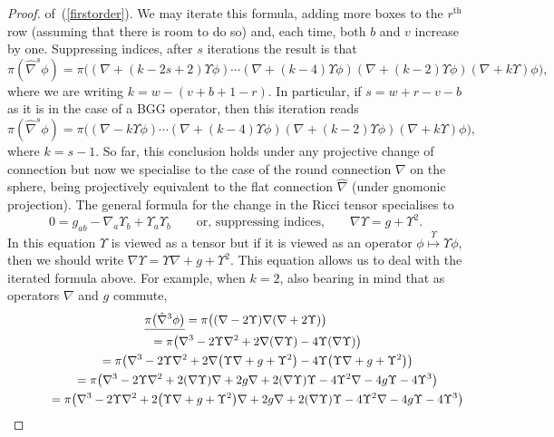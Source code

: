 \begin{proof}
of~(\ref{firstorder}). We may iterate this formula, adding more boxes to the
$r^{\mathrm{th}}$ row (assuming that there is room to do so) and, each time,
both $b$ and $v$ increase by one. Suppressing indices, after $s$
iterations the result is that
\[\pi(\hat\nabla^s\phi)=\pi\big(
(\nabla+(k-2s+2)\Upsilon\phi)\cdots
(\nabla+(k-4)\Upsilon\phi)(\nabla+(k-2)\Upsilon\phi)
(\nabla+k\Upsilon)\phi\big),\]
where we are writing $k=w-(v+b+1-r)$. In particular, if $s=w+r-v-b$ as it
is in the case of a BGG operator, then this iteration reads
\[\pi(\hat\nabla^s\phi)=\pi\big(
(\nabla-k\Upsilon\phi)\cdots
(\nabla+(k-4)\Upsilon\phi)(\nabla+(k-2)\Upsilon\phi)
(\nabla+k\Upsilon)\phi\big),\]
where $k=s-1$.
So far, this conclusion holds under any projective change of connection but now
we specialise to the case of the round connection $\nabla$ on the sphere, being
projectively equivalent to the f\/lat connection $\hat\nabla$ (under gnomonic
projection). The general formula \cite[(3.4)]{eProjective} for the
change in the Ricci tensor specialises to
\[0=g_{ab}-\nabla_a\Upsilon_b+\Upsilon_a\Upsilon_b\qquad\mbox{or, suppressing
indices,}\qquad\nabla\Upsilon=g+\Upsilon^2.\]
In this equation $\Upsilon$ is viewed as a tensor but if it is viewed as an
operator $\phi\stackrel{\Upsilon}{\longmapsto}\Upsilon\phi$, then we should
write $\nabla\Upsilon=\Upsilon\nabla+g+\Upsilon^2$. This equation allows us to
deal with the iterated formula above. For example, when $k=2$, also bearing in
mind that as operators $\nabla$ and $g$ commute,
 \begin{gather*}
 \underline{\pi\big(\hat\nabla^3\phi\big)}=
 \pi\big((\nabla-2\Upsilon)\nabla(\nabla+2\Upsilon)\big)\\
\hphantom{\underline{\pi\big(\hat\nabla^3\phi\big)}}{} = \pi\big(\nabla^3-2\Upsilon\nabla^2+2\nabla(\nabla\Upsilon)
-4\Upsilon(\nabla\Upsilon)\big)\\
\hphantom{\underline{\pi\big(\hat\nabla^3\phi\big)}}{} =
\pi\big(\nabla^3-2\Upsilon\nabla^2+2\nabla\big(\Upsilon\nabla+g+\Upsilon^2\big)
-4\Upsilon\big(\Upsilon\nabla+g+\Upsilon^2\big)\big)\\
\hphantom{\underline{\pi\big(\hat\nabla^3\phi\big)}}{} = \pi\big(\nabla^3-2\Upsilon\nabla^2+2(\nabla\Upsilon)\nabla+2g\nabla
+2(\nabla\Upsilon)\Upsilon
-4\Upsilon^2\nabla-4g\Upsilon-4\Upsilon^3\big)\\
\hphantom{\underline{\pi\big(\hat\nabla^3\phi\big)}}{} = \pi\big(\nabla^3-2\Upsilon\nabla^2+2\big(\Upsilon\nabla+g+\Upsilon^2\big)\nabla+2g\nabla
+2(\nabla\Upsilon)\Upsilon
-4\Upsilon^2\nabla-4g\Upsilon-4\Upsilon^3\big)\\

\end{gather*}
\end{proof}
